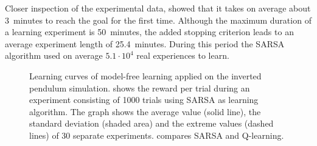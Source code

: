 Closer inspection of the experimental data, showed that it takes on average about 3~minutes to reach the goal for the first time. Although the maximum duration of a learning experiment is 50~minutes, the added stopping criterion leads to an average experiment length of 25.4~minutes. During this period the SARSA algorithm used on average $5.1\cdot 10^4$ real experiences to learn. 
\begin{figure}[htbp]
	\centering
	\caption[Inverted pendulum: Model-free learning]{Learning curves of model-free learning applied on the inverted pendulum simulation.  shows the reward per trial during an experiment consisting of 1000 trials using SARSA as learning algorithm. The graph shows the average value (solid line), the standard deviation (shaded area) and the extreme values (dashed lines) of 30 separate experiments.  compares SARSA and Q-learning.}
	\label{fig:PS-SARSAlearningCurve}
\end{figure}


